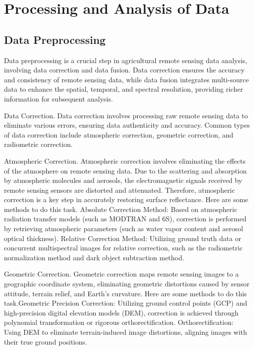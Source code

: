 \section{Processing and Analysis of Data}

\subsection{Data Preprocessing}
Data preprocessing is a crucial step in agricultural remote sensing data analysis, involving data correction and data fusion. Data correction ensures the accuracy and consistency of remote sensing data, while data fusion integrates multi-source data to enhance the spatial, temporal, and spectral resolution, providing richer information for subsequent analysis.

Data Correction\cite{huangAgriculturalRemoteSensing2018}.
Data correction involves processing raw remote sensing data to eliminate various errors, ensuring data authenticity and accuracy. Common types of data correction include atmospheric correction, geometric correction, and radiometric correction.

Atmospheric Correction\cite{seelanRemoteSensingApplications2003}. 
Atmospheric correction involves eliminating the effects of the atmosphere on remote sensing data. Due to the scattering and absorption by atmospheric molecules and aerosols, the electromagnetic signals received by remote sensing sensors are distorted and attenuated. Therefore, atmospheric correction is a key step in accurately restoring surface reflectance. Here are some methods to do this task.
Absolute Correction Method: Based on atmospheric radiation transfer models (such as MODTRAN and 6S), correction is performed by retrieving atmospheric parameters (such as water vapor content and aerosol optical thickness).
Relative Correction Method: Utilizing ground truth data or concurrent multispectral images for relative correction, such as the radiometric normalization method and dark object subtraction method.

Geometric Correction\cite{geRemoteSensingSoil2011}.
Geometric correction maps remote sensing images to a geographic coordinate system, eliminating geometric distortions caused by sensor attitude, terrain relief, and Earth's curvature. Here are some methods to do this task.Geometric Precision Correction: Utilizing ground control points (GCP) and high-precision digital elevation models (DEM), correction is achieved through polynomial transformation or rigorous orthorectification. Orthorectification: Using DEM to eliminate terrain-induced image distortions, aligning images with their true ground positions.

